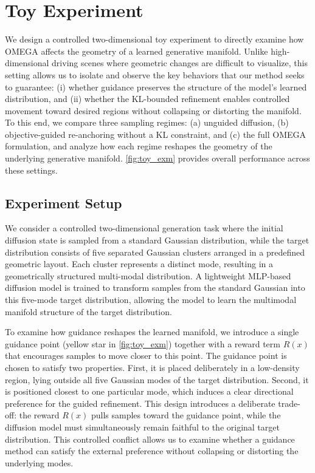 \documentclass[10pt,twocolumn,letterpaper]{article}
\theoremstyle{plain}
\theoremstyle{remark}
\begin{document}
\section{Toy Experiment}
\label{sec:toy}

We design a controlled two-dimensional toy experiment to directly
examine how OMEGA affects the geometry of a learned generative
manifold.  
Unlike high-dimensional driving scenes where geometric changes are
difficult to visualize, this setting allows us to isolate and
observe the key behaviors that our method seeks to guarantee:
(i) whether guidance preserves the structure of the model’s learned
distribution, and  
(ii) whether the KL-bounded refinement enables controlled movement
toward desired regions without collapsing or distorting the manifold.  
To this end, we compare three sampling regimes: (a) unguided diffusion, (b) objective-guided re-anchoring without a KL constraint, and (c) the full OMEGA formulation, and analyze how each regime reshapes the geometry of the underlying generative manifold.
\cref{fig:toy_exm} provides overall performance across these settings.

\subsection{Experiment Setup}

We consider a controlled two-dimensional generation task where the
initial diffusion state is sampled from a standard Gaussian
distribution, while the target distribution consists of five
separated Gaussian clusters arranged in a predefined geometric
layout.
Each cluster represents a distinct mode, resulting in a geometrically
structured multi-modal distribution.
A lightweight MLP-based diffusion model is trained to transform samples
from the standard Gaussian into this five-mode target distribution,
allowing the model to learn the multimodal manifold structure of the target distribution.

To examine how guidance reshapes the learned manifold, we introduce a
single guidance point (yellow star in \cref{fig:toy_exm}) together with a
reward term \(R(x)\) that encourages samples to move closer to this point.
The guidance point is chosen to satisfy two properties. First, it is
placed deliberately in a low-density region, lying outside all five
Gaussian modes of the target distribution. Second, it is positioned
closest to one particular mode, which induces a clear directional
preference for the guided refinement. 
This design introduces a deliberate trade-off:
the reward \(R(x)\) pulls samples toward the guidance point,
while the diffusion model must simultaneously remain faithful to the original target distribution.
This controlled conflict allows us to examine whether a guidance method can satisfy the external preference without collapsing or distorting the underlying modes.
\end{document}
